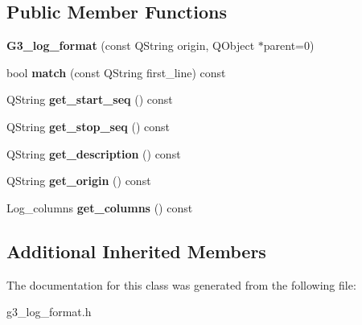 \subsection*{Public Member Functions}
\begin{DoxyCompactItemize}
\item 
\hypertarget{class_log__viewer_1_1_g3__log__format_aeb028cfa8a2cbe33e3af8c4a6e86baf1}{{\bfseries G3\-\_\-log\-\_\-format} (const Q\-String origin, Q\-Object $\ast$parent=0)}\label{class_log__viewer_1_1_g3__log__format_aeb028cfa8a2cbe33e3af8c4a6e86baf1}

\item 
\hypertarget{class_log__viewer_1_1_g3__log__format_a52e7429932030e6f0c3a4082c4eec18d}{bool {\bfseries match} (const Q\-String first\-\_\-line) const }\label{class_log__viewer_1_1_g3__log__format_a52e7429932030e6f0c3a4082c4eec18d}

\item 
\hypertarget{class_log__viewer_1_1_g3__log__format_a1919f49ca029f72d556d4deb8ca9432a}{Q\-String {\bfseries get\-\_\-start\-\_\-seq} () const }\label{class_log__viewer_1_1_g3__log__format_a1919f49ca029f72d556d4deb8ca9432a}

\item 
\hypertarget{class_log__viewer_1_1_g3__log__format_a1f7b4b3a5242176cc725f0a7fa611440}{Q\-String {\bfseries get\-\_\-stop\-\_\-seq} () const }\label{class_log__viewer_1_1_g3__log__format_a1f7b4b3a5242176cc725f0a7fa611440}

\item 
\hypertarget{class_log__viewer_1_1_g3__log__format_a47b38b470831ab271b03b97687e07a04}{Q\-String {\bfseries get\-\_\-description} () const }\label{class_log__viewer_1_1_g3__log__format_a47b38b470831ab271b03b97687e07a04}

\item 
\hypertarget{class_log__viewer_1_1_g3__log__format_a7a066e1f01a24945efbf5d489cd21ac3}{Q\-String {\bfseries get\-\_\-origin} () const }\label{class_log__viewer_1_1_g3__log__format_a7a066e1f01a24945efbf5d489cd21ac3}

\item 
\hypertarget{class_log__viewer_1_1_g3__log__format_a9d9748792b18f837101811d1998013d5}{Log\-\_\-columns {\bfseries get\-\_\-columns} () const }\label{class_log__viewer_1_1_g3__log__format_a9d9748792b18f837101811d1998013d5}

\end{DoxyCompactItemize}
\subsection*{Additional Inherited Members}


The documentation for this class was generated from the following file\-:\begin{DoxyCompactItemize}
\item 
g3\-\_\-log\-\_\-format.\-h\end{DoxyCompactItemize}
